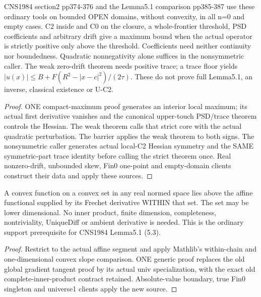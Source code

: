 \begin{lemma}
  \label{lem:elliptic-maximum}
  \leanok
  CNS1984 section2 pp374-376 and the Lemma5.1 comparison pp385-387 use these
  ordinary tools on bounded OPEN domains, without convexity, in all n=0 and
  empty cases. C2 inside and C0 on the closure, a whole-frontier threshold,
  PSD coefficients and arbitrary drift give a maximum bound when the actual
  operator is strictly positive only above the threshold. Coefficients need
  neither continuity nor boundedness. Quadratic nonnegativity alone suffices
  in the nonsymmetric caller. The weak zero-drift theorem needs positive
  trace; a trace floor yields
  $|u(x)|\le B+F( R^2-|x-c|^2)/(2\tau)$.
  These do not prove full Lemma5.1, an inverse, classical existence or U-C2.
\end{lemma}
\begin{proof}
  \leanok
  ONE compact-maximum proof generates an interior local maximum; its actual
  first derivative vanishes and the canonical upper-touch PSD/trace theorem
  controls the Hessian. The weak theorem calls that strict core with the
  actual quadratic perturbation. The barrier applies the weak theorem to
  both signs. The nonsymmetric caller generates actual local-C2 Hessian
  symmetry and the SAME symmetric-part trace identity before calling the
  strict theorem once. Real nonzero-drift, unbounded skew, Fin0 one-point and
  empty-domain clients construct their data and apply these sources.
\end{proof}


\begin{lemma}
  \label{lem:convex-within-support}
  \leanok
  A convex function on a convex set in any real normed space lies above
  the affine functional supplied by its Frechet derivative WITHIN that set.
  The set may be lower dimensional. No inner product, finite dimension,
  completeness, nontriviality, UniqueDiff or ambient derivative is needed.
  This is the ordinary support prerequisite for CNS1984 Lemma5.1 (5.3).
\end{lemma}
\begin{proof}
  \leanok
  Restrict to the actual affine segment and apply Mathlib's within-chain
  and one-dimensional convex slope comparison. ONE generic proof replaces
  the old global gradient tangent proof by its actual univ specialization,
  with the exact old complete-inner-product contract retained. Absolute-value
  boundary, true Fin0 singleton and universe1 clients apply the new source.
\end{proof}


